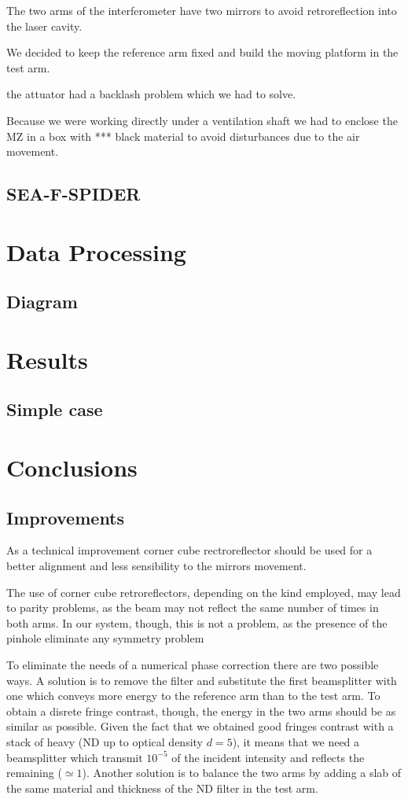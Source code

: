 \documentclass[12pt,a4paper,twoside]{article}
\begin{document}
The two arms of the interferometer have two mirrors to avoid retroreflection into the laser cavity.

We decided to keep the reference arm fixed and build the moving platform in the test arm.

the attuator had a backlash problem which we had to solve.

Because we were working directly under a ventilation shaft we had to enclose the MZ in a box with *** black material to avoid disturbances due to the air movement.

\subsection{SEA-F-SPIDER}


\section{Data Processing}
\subsection{Diagram}
\section{Results}
\subsection{Simple case}
\section{Conclusions}
\subsection{Improvements}
As a technical improvement corner cube rectroreflector should be used for a better alignment and less sensibility to the mirrors movement.

The use of corner cube retroreflectors, depending on the kind employed, may lead to parity problems, as the beam may not reflect the same number of times in both arms.
In our system, though, this is not a problem, as the presence of the pinhole eliminate any symmetry problem

To eliminate the needs of a numerical phase correction there are two possible ways.
A solution is to remove the filter and substitute the first beamsplitter with one which conveys more energy to the reference arm than to the test arm.
To obtain a disrete fringe contrast, though, the energy in the two arms should be as similar as possible.
Given the fact that we obtained good fringes contrast with a stack of heavy (ND up to optical density $d=5$), it means that we need a beamsplitter which transmit $10^{-5}$ of the incident intensity and reflects the remaining ($\simeq 1$).
Another solution is to balance the two arms by adding a slab of the same material and thickness of the ND filter in the test arm.
\end{document}
